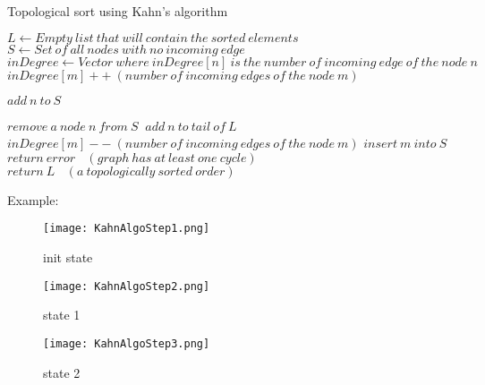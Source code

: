 \documentclass[12pt]{article}
\begin{document}
\begin{algorithm}

  \caption{Topological sort using Kahn's algorithm  \cite{1}}
  
  \begin{algorithmic}[1]
    \Statex
        \State $L \gets Empty\ list\ that\ will\ contain\ the\ sorted\ elements $
        \State $S \gets Set\ of\ all\ nodes\ with\ no\ incoming\ edge\ $
        \State $inDegree \gets Vector\ where\ inDegree[n]\ is\ the\ number\ of\ incoming\ edge\ of\ the\ node\ n$
                \State $inDegree[m]++\  (number\ of\ incoming\ edges\ of\ the\ node\ m) $
            \EndFor
        \EndFor
        
                \State $ add\ n\ to\ S $
                \EndIf
        \EndFor
        
        
            \State $remove\ a\ node\ n\ from\ S\ $
            \State $add\ n\ to\ tail\ of\ L\ $
                 \State $inDegree[m]--\  (number\ of\ incoming\ edges\ of\ the\ node\ m) $
                    \State $insert\ m\ into\ S$
                \EndIf
            \EndFor
        \EndWhile
            \State $return\ error\  \ \ \ (graph\ has\ at\ least\ one\ cycle)$
        \Else
        \State $return\ L\  \ \ \ (a\ topologically\ sorted\ order)$
        \EndIf
  \end{algorithmic}
 
\end{algorithm}

Example:
\begin{figure}[H]
\centering
\texttt{[image: KahnAlgoStep1.png]}
\caption{init state}
\end{figure}

\begin{figure}[H]
\centering
\texttt{[image: KahnAlgoStep2.png]}
\caption{state 1}
\end{figure}

\begin{figure}[H]
\centering
\texttt{[image: KahnAlgoStep3.png]}
\caption{state 2}
\end{figure}
\end{document}
